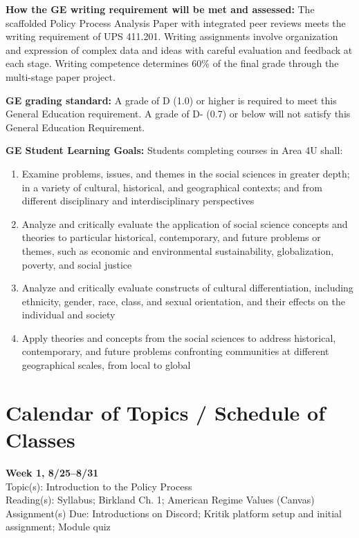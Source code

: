 \documentclass[12pt]{article}     %
\begin{document}
\vspace{0.5em}
\noindent \textbf{How the GE writing requirement will be met and assessed:}
The scaffolded Policy Process Analysis Paper with integrated peer reviews meets the writing requirement of UPS 411.201. Writing assignments involve organization and expression of complex data and ideas with careful evaluation and feedback at each stage. Writing competence determines 60\% of the final grade through the multi-stage paper project.

\vspace{0.5em}
\noindent \textbf{GE grading standard:}
A grade of D (1.0) or higher is required to meet this General Education requirement. A grade of D- (0.7) or below will not satisfy this General Education Requirement.

\vspace{0.5em}
\noindent \textbf{GE Student Learning Goals:}
Students completing courses in Area 4U shall:
\begin{enumerate}
\item Examine problems, issues, and themes in the social sciences in greater depth; in a variety of cultural, historical, and geographical contexts; and from different disciplinary and interdisciplinary perspectives
\item Analyze and critically evaluate the application of social science concepts and theories to particular historical, contemporary, and future problems or themes, such as economic and environmental sustainability, globalization, poverty, and social justice
\item Analyze and critically evaluate constructs of cultural differentiation, including ethnicity, gender, race, class, and sexual orientation, and their effects on the individual and society
\item Apply theories and concepts from the social sciences to address historical, contemporary, and future problems confronting communities at different geographical scales, from local to global
\end{enumerate}

\section{Calendar of Topics / Schedule of Classes}

\noindent \textbf{Week 1, 8/25--8/31}\\
Topic(s): Introduction to the Policy Process\\
Reading(s): Syllabus; Birkland Ch. 1; American Regime Values (Canvas)\\
Assignment(s) Due: Introductions on Discord; Kritik platform setup and initial assignment; Module quiz\
\end{document}

